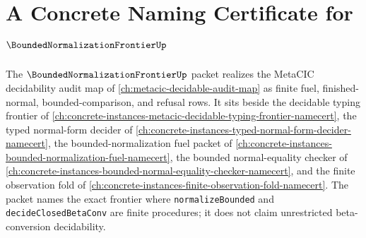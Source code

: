 \chapter{A Concrete Naming Certificate for $\BoundedNormalizationFrontierUp$}
\label{ch:concrete-instances-bounded-normalization-frontier-namecert}

The $\BoundedNormalizationFrontierUp$ packet realizes the MetaCIC decidability audit map of \autoref{ch:metacic-decidable-audit-map} as finite fuel, finished-normal, bounded-comparison, and refusal rows. It sits beside the decidable typing frontier of \autoref{ch:concrete-instances-metacic-decidable-typing-frontier-namecert}, the typed normal-form decider of \autoref{ch:concrete-instances-typed-normal-form-decider-namecert}, the bounded-normalization fuel packet of \autoref{ch:concrete-instances-bounded-normalization-fuel-namecert}, the bounded normal-equality checker of \autoref{ch:concrete-instances-bounded-normal-equality-checker-namecert}, and the finite observation fold of \autoref{ch:concrete-instances-finite-observation-fold-namecert}. The packet names the exact frontier where \texttt{normalizeBounded} and \texttt{decideClosedBetaConv} are finite procedures; it does not claim unrestricted beta-conversion decidability.



